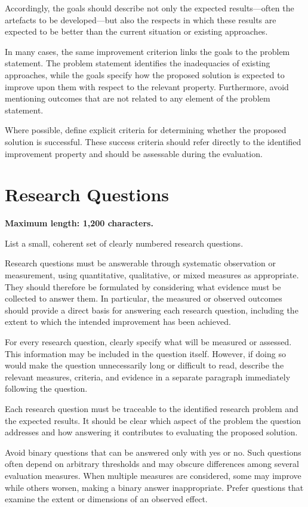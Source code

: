 \documentclass[runningheads]{llncs}
\begin{document}
Accordingly, the goals should describe not only the expected results—often the artefacts to be developed—but also the respects in which these results are expected to be better than the current situation or existing approaches.

In many cases, the same improvement criterion links the goals to the problem statement. The problem statement identifies the inadequacies of existing approaches, while the goals specify how the proposed solution is expected to improve upon them with respect to the relevant property. Furthermore, avoid mentioning outcomes that are not related to any element of the problem statement.

Where possible, define explicit criteria for determining whether the proposed solution is successful. These success criteria should refer directly to the identified improvement property and should be assessable during the evaluation.


\section{Research Questions}
\textbf{Maximum length: 1,200 characters.}

List a small, coherent set of clearly numbered research questions.

Research questions must be answerable through systematic observation or measurement, using quantitative, qualitative, or mixed measures as appropriate. They should therefore be formulated by considering what evidence must be collected to answer them. In particular, the measured or observed outcomes should provide a direct basis for answering each research question, including the extent to which the intended improvement has been achieved.

For every research question, clearly specify what will be measured or assessed. This information may be included in the question itself. However, if doing so would make the question unnecessarily long or difficult to read, describe the relevant measures, criteria, and evidence in a separate paragraph immediately following the question.

Each research question must be traceable to the identified research problem and the expected results. It should be clear which aspect of the problem the question addresses and how answering it contributes to evaluating the proposed solution.

Avoid binary questions that can be answered only with yes or no. Such questions often depend on arbitrary thresholds and may obscure differences among several evaluation measures. When multiple measures are considered, some may improve while others worsen, making a binary answer inappropriate. Prefer questions that examine the extent or dimensions of an observed effect.
\end{document}

